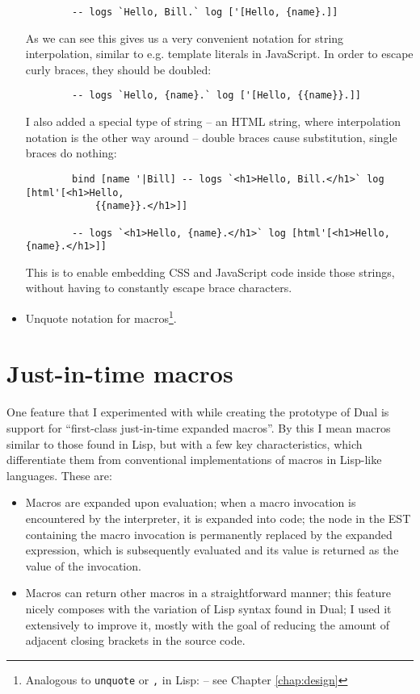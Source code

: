 \begin{itemize}
\begin{lstlisting}
        -- logs `Hello, Bill.` log ['[Hello, {name}.]]
    \end{lstlisting}
    
    As we can see this gives us a very convenient notation for string
    interpolation, similar to e.g. template literals in
    JavaScript\cite{mdn_template_strings}.
    In order to escape curly braces, they should be doubled:
    \begin{lstlisting}
        -- logs `Hello, {name}.` log ['[Hello, {{name}}.]]
    \end{lstlisting}
    
    I also added a special type of string -- an HTML string, where interpolation
    notation is the other way around -- double braces cause substitution, single
    braces do nothing:
    \begin{lstlisting}
        bind [name '|Bill] -- logs `<h1>Hello, Bill.</h1>` log [html'[<h1>Hello,
            {{name}}.</h1>]]
        
        -- logs `<h1>Hello, {name}.</h1>` log [html'[<h1>Hello, {name}.</h1>]]
    \end{lstlisting}
    
    This is to enable embedding CSS and JavaScript code inside those strings,
    without having to constantly escape brace characters.
    
    \item Unquote notation for macros\footnote{Analogous to \texttt{unquote} or
      \texttt{,} in Lisp:
      \cite[Section~1.3.8]{racket_reference}
      -- see Chapter \ref{chap:design}}.
\end{itemize}

\section{Just-in-time macros}
One feature that I experimented with while creating the prototype of Dual is
support for ``first-class just-in-time expanded macros''. By this I mean macros
similar to those found in Lisp, but with a few key characteristics, which
differentiate them from conventional implementations of macros in Lisp-like
languages. These are:
\begin{itemize}
    \item Macros are expanded upon evaluation; when a macro invocation is
    encountered by the interpreter, it is expanded into code; the node in
    the EST containing the macro invocation is permanently replaced by the
    expanded expression, which is subsequently evaluated and its value is
    returned as the value of the invocation.
    \item Macros can return other macros in a straightforward manner; this
    feature nicely composes with the variation of Lisp syntax found in
    Dual; I used it extensively to improve it, mostly with the goal of
    reducing the amount of adjacent closing brackets in the source code.
\end{itemize}

